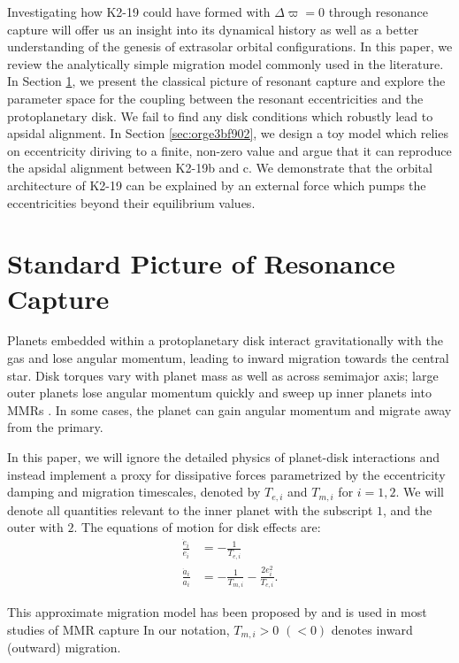 \documentclass[usenatbib]{mnras}
\begin{document}
Investigating how K2-19 could have formed with \(\Delta\varpi=0\)
through resonance capture will offer us an insight into its dynamical
history as well as a better understanding of the genesis of extrasolar
orbital configurations.  In this paper, we review the analytically
simple migration model commonly used in the literature.  In Section
\ref{sec:orgc84e769}, we present the classical picture of resonant capture
and explore the parameter space for the coupling between the resonant
eccentricities and the protoplanetary disk. We fail to find any disk
conditions which robustly lead to apsidal alignment.  In Section
\ref{sec:orge3bf902}, we design a toy model which relies on eccentricity
diriving to a finite, non-zero value and argue that it can reproduce
the apsidal alignment between K2-19b and c. We demonstrate that the
orbital architecture of K2-19 can be explained by an external force
which pumps the eccentricities beyond their equilibrium values.

\section{Standard Picture of Resonance Capture}
\label{sec:orgc84e769}
Planets embedded within a protoplanetary disk interact gravitationally
with the gas and lose angular momentum, leading to inward migration
towards the central star.  Disk torques vary with planet mass as well
as across semimajor axis; large outer planets lose angular momentum
quickly and sweep up inner planets into MMRs
\cite{tanaka_three-dimensional_2004,xu_migration_2018}.  In some
cases, the planet can gain angular momentum and migrate away from the
primary.

In this paper, we will ignore the detailed physics of planet-disk
interactions and instead implement a proxy for dissipative forces
parametrized by the eccentricity damping and migration timescales,
denoted by \(T_{e,i}\) and \(T_{m,i}\) for \(i=1,2\).  We will denote all
quantities relevant to the inner planet with the subscript \(1\), and the
outer with \(2\).  The equations of motion for disk effects are:
\begin{align}\label{eq:disforce}
  \frac{\dot{e}_i}{e_i} &= -\frac{1}{T_{e,i}} \\
  \frac{\dot{a}_i}{a_i} &= -\frac{1}{T_{m,i}} -\frac{2e_i^2}{T_{e,i}}.
\end{align}

\noindent This approximate migration model has been proposed
by \citet{goldreich_disk-satellite_1980-1} and is used in most studies
of MMR capture
\cite[e.g.][]{goldreich_overstable_2014,xu_migration_2018} In our
notation, \(T_{m,i}>0\) \((<0)\) denotes inward (outward) migration.
\end{document}
